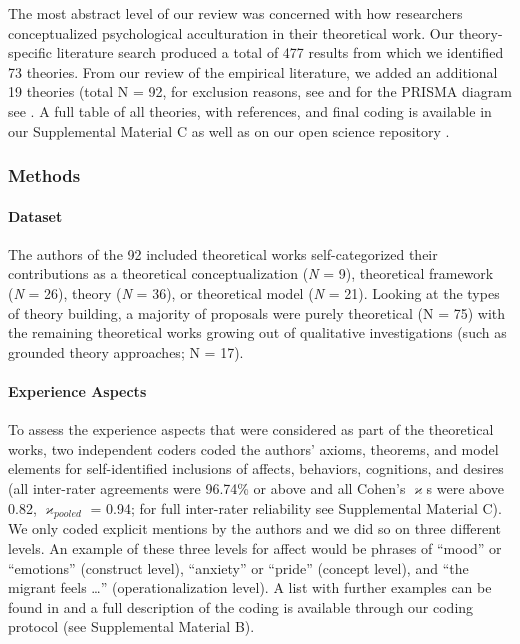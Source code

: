 The most abstract level of our review was concerned with how researchers
conceptualized psychological acculturation in their theoretical work.
Our theory-specific literature search produced a total of 477 results
from which we identified 73 theories. From our review of the empirical
literature, we added an additional 19 theories (total N = 92, for
exclusion reasons, see  and for the
PRISMA diagram see . A full table of all
theories, with references, and final coding is available in our
Supplemental Material C as well as on our open science repository
\citep[see][]{Kreienkamp2021d, Kreienkamp2021e}.



\subsubsection{Methods}
\paragraph{Dataset}

The authors of the 92 included theoretical works self-categorized their
contributions as a theoretical conceptualization (\textit{N} = 9),
theoretical framework (\textit{N} = 26), theory (\textit{N} = 36), or
theoretical model (\textit{N} = 21). Looking at the types of theory
building, a majority of proposals were purely theoretical (N = 75) with
the remaining theoretical works growing out of qualitative
investigations (such as grounded theory approaches; N = 17).

\paragraph{Experience Aspects}

To assess the experience aspects that were considered as part of the
theoretical works, two independent coders coded the authors' axioms,
theorems, and model elements for self-identified inclusions of affects,
behaviors, cognitions, and desires (all inter-rater agreements were
96.74\% or above and all Cohen's \(\varkappa\)s were above 0.82,
\(\varkappa_{pooled}\) = 0.94; for full inter-rater reliability see
Supplemental Material C). We only coded explicit mentions by the authors
and we did so on three different levels. An example of these three
levels for affect would be phrases of ``mood'' or ``emotions''
(construct level), ``anxiety'' or ``pride'' (concept level), and ``the
migrant feels \ldots{}'' (operationalization level). A list with further
examples can be found in  and a full
description of the coding is available through our coding protocol (see
Supplemental Material B).

